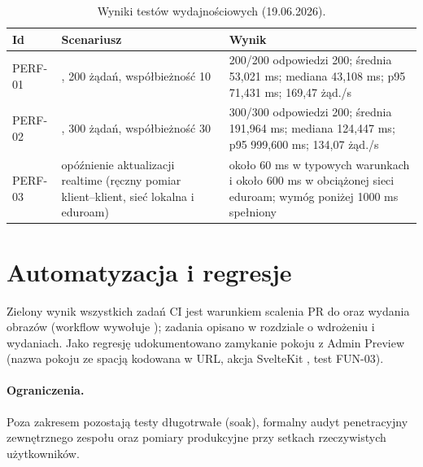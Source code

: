 \begin{table}[H]
\centering\small
\begin{tabularx}{\textwidth}{@{}p{}p{}Y@{}}
\toprule
\textbf{Id} & \textbf{Scenariusz} & \textbf{Wynik} \\
\midrule
PERF-01 & , 200 żądań, współbieżność 10 & 200/200 odpowiedzi 200; średnia 53,021 ms; mediana 43,108 ms; p95 71,431 ms; 169,47 żąd./s \\
PERF-02 & , 300 żądań, współbieżność 30 & 300/300 odpowiedzi 200; średnia 191,964 ms; mediana 124,447 ms; p95 999,600 ms; 134,07 żąd./s \\
PERF-03 & opóźnienie aktualizacji realtime (ręczny pomiar klient--klient, sieć lokalna i eduroam) & około 60 ms w typowych warunkach i około 600 ms w obciążonej sieci eduroam; wymóg poniżej 1000 ms spełniony \\
\bottomrule
\end{tabularx}
\caption{Wyniki testów wydajnościowych (19.06.2026).}
\end{table}

\section{Automatyzacja i regresje}
\label{sec:op-testy-ci}

Zielony wynik wszystkich zadań CI jest warunkiem scalenia PR do  oraz
wydania obrazów (workflow  wywołuje ); zadania opisano w
rozdziale o wdrożeniu i wydaniach. Jako regresję udokumentowano zamykanie pokoju z
Admin Preview (nazwa pokoju ze spacją kodowana w URL, akcja SvelteKit ,
test FUN-03).

\paragraph{Ograniczenia.} Poza zakresem pozostają testy długotrwałe (soak), formalny
audyt penetracyjny zewnętrznego zespołu oraz pomiary produkcyjne przy setkach
rzeczywistych użytkowników.


